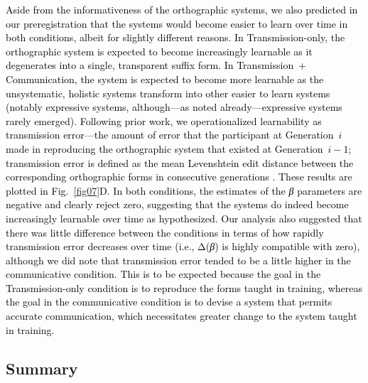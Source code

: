 \documentclass[doc,biblatex]{apa7}
\newcommand\firstrevision[1]{\textcolor{black}{#1}}
\newcommand\secondrevision[1]{\textcolor{black}{#1}}
\begin{document}
\firstrevision{Aside from the informativeness of the orthographic systems, we also predicted in our preregistration that the systems would become easier to learn over time in both conditions, albeit for slightly different reasons. In Transmission-only, the orthographic system is expected to become increasingly learnable as it degenerates into a single, transparent suffix form. In Transmission~+ Communication, the system is expected to become more learnable as the unsystematic, holistic systems transform into other easier to learn systems (notably expressive systems, although---as noted already---expressive systems rarely emerged). Following prior work, we operationalized learnability as transmission error---the amount of error that the participant at Generation~$i$ made in reproducing the orthographic system that existed at Generation~$i-1$; transmission error is defined as the mean Levenshtein edit distance between the corresponding orthographic forms in consecutive generations \parencite[see e.g.,][]{Kirby:2008}. These results are plotted in Fig.~\ref{fig07}D. In both conditions, the estimates of the \textit{β} parameters are negative and clearly reject zero, suggesting that the systems do indeed become increasingly learnable over time \secondrevision{as hypothesized. Our analysis also suggested that there was little difference between the conditions in terms of how rapidly transmission error decreases over time (i.e., Δ(\textit{β}) is highly compatible with zero), although we did note that transmission error tended to be a little higher in the communicative condition.} This is to be expected because the goal in the Transmission-only condition is to reproduce the forms taught in training, whereas the goal in the communicative condition is to devise a system that permits accurate communication, which necessitates greater change to the system taught in training.}

\subsection{Summary}
\end{document}
